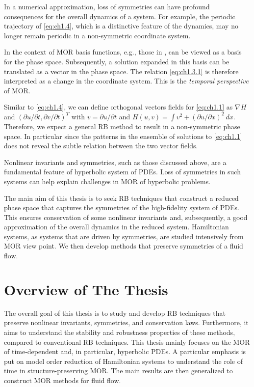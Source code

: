 In a numerical approximation, loss of symmetries can have profound consequences for the overall dynamics of a system. For example, the periodic trajectory of \eqref{eq:ch1.4}, which is a distinctive feature of the dynamics, may no longer remain periodic in a non-symmetric coordinate system.

In the context of MOR basis functions, e.g., those in , can be viewed as a basis for the phase space. Subsequently, a solution expanded in this basis can be translated as a vector in the phase space. The relation \eqref{eq:ch1.3.1} is therefore interpreted as a change in the coordinate system. This is the \emph{temporal perspective} of MOR.  

Similar to \eqref{eq:ch1.4}, we can define orthogonal vectors fields for \eqref{eq:ch1.1} as $\nabla H$ and $(\partial u/\partial t,\partial v/\partial t)^T$ with $v = \partial u/\partial t$ and $H(u,v) = \int v^2 + (\partial u / \partial x)^2 \ dx$. Therefore, we expect a general RB method to result in a non-symmetric phase space. In particular since the patterns in the ensemble of solutions to \eqref{eq:ch1.1} does not reveal the subtle relation between the two vector fields.

Nonlinear invariants and symmetries, such as those discussed above, are a fundamental feature of hyperbolic system of PDEs. Loss of symmetries in such systems can help explain challenges in MOR of hyperbolic problems.

The main aim of this thesis is to seek RB techniques that construct a reduced phase space that captures the symmetries of the high-fidelity system of PDEs. This ensures conservation of some nonlinear invariants and, subsequently, a good approximation of the overall dynamics in the reduced system. Hamiltonian systems, as systems that are driven by symmetries, are studied intensively from MOR view point. We then develop methods that preserve symmetries of a fluid flow.

\section{Overview of The Thesis}
The overall goal of this thesis is to study and develop RB techniques that preserve nonlinear invariants, symmetries, and conservation laws. Furthermore, it aims to understand the stability and robustness properties of these methods, compared to conventional RB techniques. This thesis mainly focuses on the MOR of time-dependent and, in particular, hyperbolic PDEs. A particular emphasis is put on model order reduction of Hamiltonian systems to understand the role of time in structure-preserving MOR. The main results are then generalized to construct MOR methods for fluid flow.

